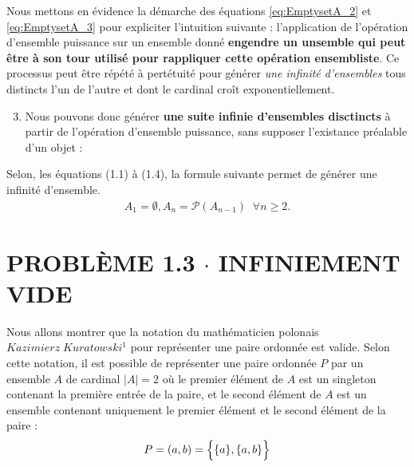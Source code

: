 \documentclass[8pt]{report}
\begin{document}
    \begin{note}{}{}
        Nous mettons en évidence la démarche des équations \eqref{eq:EmptysetA_2} et \eqref{eq:EmptysetA_3} 
        pour expliciter l'intuition suivante : l'application de l'opération d'ensemble puissance sur un 
        ensemble donné \textbf{engendre un unsemble qui peut être à son tour utilisé pour rappliquer 
        cette opération ensembliste}. 
        Ce processus peut être répété à pertétuité pour générer \textit{une infinité d'ensembles} 
        tous distincts l'un de l'autre et dont le cardinal croît exponentiellement. 
    \end{note}
    \begin{enumerate}
        \setcounter{enumi}{2}
        \item Nous pouvons donc générer \textbf{une suite infinie d'ensembles disctincts} 
            à partir de l'opération d'ensemble puissance, sans supposer l'existance préalable d'un objet :
    \end{enumerate}


    \begin{Reponse}{}{}
            Selon, les équations (1.1) à (1.4), la formule suivante permet de générer une infinité d'ensemble. 
            \begin{align*}
                A_1 = \emptyset, A_n = \mathcal{P}(A_{n-1}) \;\; \forall n \geq 2. 
            \end{align*}
    \end{Reponse}


\section*{\textnormal{PROBLÈME 1.3 \;\;\;\; $\cdot$ \;\;\;\; INFINIEMENT VIDE }}  

    Nous allons montrer que la notation du mathématicien polonais 
    $Kazimierz \; Kuratowski^1$ pour représenter une paire ordonnée est valide. 
    Selon cette notation, il est possible de représenter une paire ordonnée $P$ par un ensemble $A$ de cardinal 
    $|A| = 2$ où le 
    premier élément de $A$ est un singleton contenant la première entrée de la paire, et le second élément de $A$ 
    est un ensemble contenant uniquement le premier élément et le second élément de la paire : 
    \[ P = (a, b) = \Bigl\{ \{ a \}, \{a, b \}  \Bigr\} \]  
\end{document}
